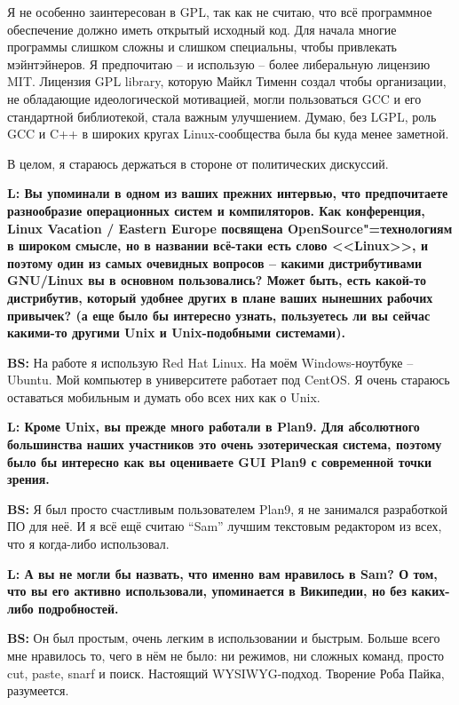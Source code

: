 \documentclass[10pt, a5paper]{article}
\begin{document}
\begin{Parallel}[p]{}{}
{Я не особенно заинтересован в GPL, так как не считаю, что всё программное обеспечение должно иметь открытый исходный код. Для начала многие программы слишком сложны и слишком специальны, чтобы привлекать мэйнтэйнеров. Я предпочитаю – и использую – более либеральную лицензию MIT. Лицензия GPL library, которую Майкл Тименн создал чтобы организации, не обладающие идеологической мотивацией, могли пользоваться GCC и его стандартной библиотекой, стала важным улучшением. Думаю, без LGPL, роль GCC и C++ в широких кругах Linux-сообщества была бы куда менее заметной.

В целом, я стараюсь держаться в стороне от политических дискуссий.

{\noindent \bf L: Вы упоминали в одном из ваших прежних интервью, что предпочитаете разнообразие операционных систем и компиляторов. Как конференция, Linux Vacation / Eastern Europe посвящена OpenSource"=технологиям в широком \linebreak смысле, но в названии всё-таки есть слово <<Linux>>, и поэтому один из самых очевидных вопросов -- какими дистрибутивами GNU/Linux вы в основном пользовались? Может быть, есть какой-то дистрибутив, который удобнее других в плане ваших нынешних рабочих привычек? (а еще было бы интересно узнать, пользуетесь ли вы сейчас какими-то другими Unix и Unix-подобными системами).} 

{\noindent \bf BS:} На работе я использую Red Hat Linux. На моём Windows-ноутбуке -- Ubuntu. Мой компьютер в университете работает под CentOS. Я очень стараюсь оставаться мобильным и думать обо всех них как о Unix.

{\noindent \bf L: Кроме Unix, вы прежде много работали в Plan9. Для абсолютного большинства наших участников это очень эзотерическая система, поэтому было бы интересно как вы оцениваете GUI Plan9  с современной точки зрения.}

{\noindent \bf BS:} Я был просто счастливым пользователем Plan9, я не занимался разработкой ПО для неё. И я всё ещё считаю “Sam” лучшим текстовым редактором из всех, что я когда-либо использовал.

{\noindent \bf L: А вы не могли бы назвать, что именно вам нравилось в Sam? О том, что вы его активно использовали, упоминается в Википедии, но без каких-либо подробностей.}

{\noindent \bf BS:} Он был простым, очень легким в использовании и быстрым. Больше всего мне нравилось то, чего в нём не было: ни режимов, ни сложных команд, просто cut, paste, snarf и поиск. Настоящий WYSIWYG-подход. Творение Роба Пайка, разумеется. 

}
\end{Parallel}
\end{document}
